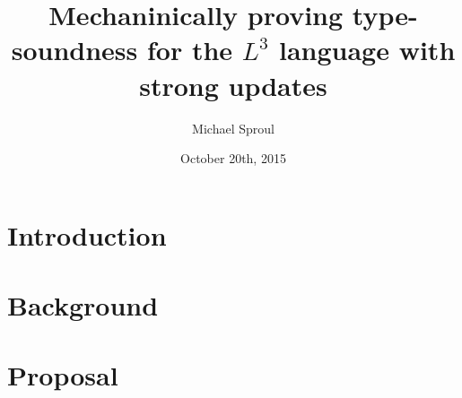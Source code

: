 \documentclass[a4paper,12pt]{article}
\title{Mechaninically proving type-soundness for the $L^3$ language with strong updates}
\author{Michael Sproul}
\date{October 20th, 2015}
\begin{document}
\maketitle

\section{Introduction}

\section{Background}

\section{Proposal}
\end{document}
